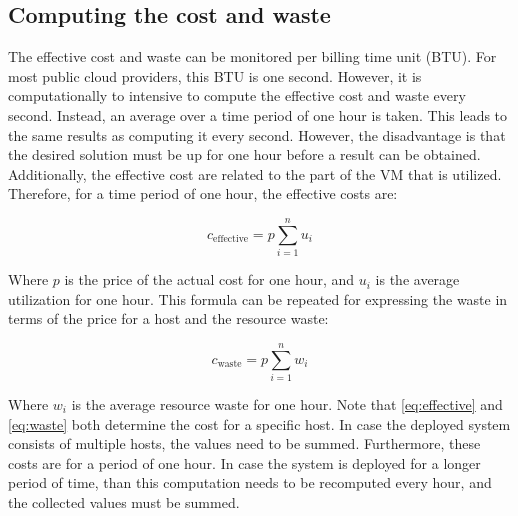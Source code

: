 %
\subsection{Computing the cost and waste} \label{sec:model}
The effective cost and waste can be monitored per billing time unit (BTU). For most public cloud providers, this BTU is one second. However, it is computationally to intensive to compute the effective cost and waste every second. Instead, an average over a time period of one hour is taken. This leads to the same results as computing it every second. However, the disadvantage is that the desired solution must be up for one hour before a result can be obtained. Additionally, the effective cost are related to the part of the VM that is utilized. Therefore, for a time period of one hour, the effective costs are:

\begin{equation} \label{eq:effective}
c_\text{effective} = p \sum_{i=1}^n u_i
\end{equation}

\noindent
Where $p$ is the price of the actual cost for one hour, and $u_i$ is the average utilization for one hour. This formula can be repeated for expressing the waste in terms of the price for a host and the resource waste:

\begin{equation} \label{eq:waste}
c_\text{waste} = p \sum_{i=1}^n w_i
\end{equation}

\noindent
Where $w_i$ is the average resource waste for one hour. Note that \autoref{eq:effective} and \autoref{eq:waste} both determine the cost for a specific host. In case the deployed system consists of multiple hosts, the values need to be summed. Furthermore, these costs are for a period of one hour. In case the system is deployed for a longer period of time, than this computation needs to be recomputed every hour, and the collected values must be summed. 

